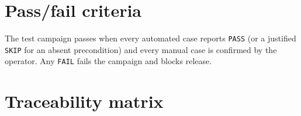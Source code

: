 \documentclass[12pt]{article}
\newcommand{\code}[1]{\texttt{#1}}
\begin{document}
\section{Pass/fail criteria}

The test campaign passes when every automated case reports \code{PASS}
(or a justified \code{SKIP} for an absent precondition) and every manual
case is confirmed by the operator.  Any \code{FAIL} fails the campaign and
blocks release.

\section{Traceability matrix}
\end{document}
